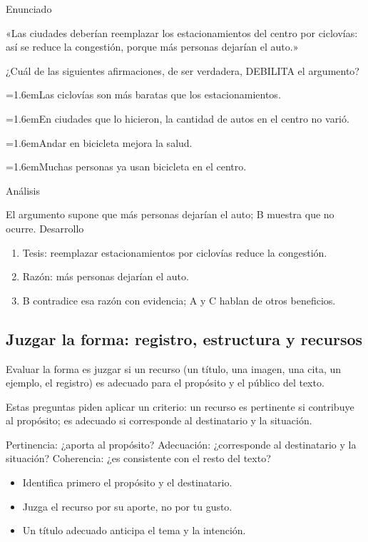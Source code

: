 \documentclass[10pt,a4paper,twocolumn]{article}
\newcommand{\alternativa}[2]{\par\noindent\hangindent=1.6em\hangafter=1\makebox[1.6em][l]{\tecla{#1}}#2\par}
\newcommand{\clave}[1]{\par\smallskip{\sffamily\footnotesize\color{esmeralda} Clave \teclaok{#1}}\par}
\begin{document}
\begin{ejemplo}
{\sffamily\footnotesize\color{zinc500} Enunciado}\par
«Las ciudades deberían reemplazar los estacionamientos del centro por ciclovías: así se reduce la congestión, porque más personas dejarían el auto.»

¿Cuál de las siguientes afirmaciones, de ser verdadera, DEBILITA el argumento?
\alternativa{A}{Las ciclovías son más baratas que los estacionamientos.}
\alternativa{B}{En ciudades que lo hicieron, la cantidad de autos en el centro no varió.}
\alternativa{C}{Andar en bicicleta mejora la salud.}
\alternativa{D}{Muchas personas ya usan bicicleta en el centro.}
\clave{B}
{\sffamily\footnotesize\color{zinc500} Análisis}\par El argumento supone que más personas dejarían el auto; B muestra que no ocurre.
{\sffamily\footnotesize\color{zinc500} Desarrollo}
\begin{enumerate}
  \item Tesis: reemplazar estacionamientos por ciclovías reduce la congestión.
  \item Razón: más personas dejarían el auto.
  \item B contradice esa razón con evidencia; A y C hablan de otros beneficios.
\end{enumerate}
\end{ejemplo}

\subsection{Juzgar la forma: registro, estructura y recursos}

Evaluar la forma es juzgar si un recurso (un título, una imagen, una cita, un ejemplo, el registro) es adecuado para el propósito y el público del texto.

Estas preguntas piden aplicar un criterio: un recurso es pertinente si contribuye al propósito; es adecuado si corresponde al destinatario y la situación.

\begin{definicion}[Criterios]
Pertinencia: ¿aporta al propósito? Adecuación: ¿corresponde al destinatario y la situación? Coherencia: ¿es consistente con el resto del texto?
\end{definicion}

\begin{ideasclave}
\begin{itemize}
  \item Identifica primero el propósito y el destinatario.
  \item Juzga el recurso por su aporte, no por tu gusto.
  \item Un título adecuado anticipa el tema y la intención.
\end{itemize}
\end{ideasclave}
\end{document}
